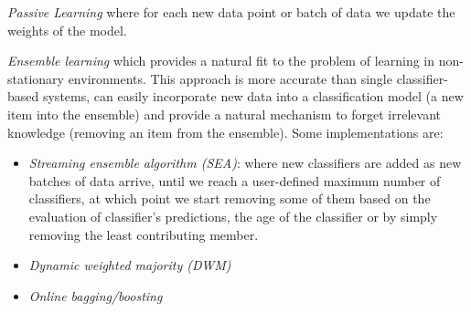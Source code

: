 \documentclass{article}
\begin{document}
      \emph{Passive Learning} where for each new data point or batch of data we update the weights of the model.
      
      \emph{Ensemble learning} which provides a natural fit to the problem of learning in non-stationary environments. This approach is more accurate than single classifier-based systems, can easily incorporate new data into a classification model (a new item into the
      ensemble) and provide a natural mechanism to forget irrelevant knowledge (removing an item from the ensemble). Some implementations are:
      \begin{itemize}
        \item \emph{Streaming ensemble algorithm (SEA)}: where new classifiers are added as new batches of data arrive, until we reach a user-defined maximum number of classifiers, at which point we start removing some of them based on the evaluation of classifier’s predictions,
        the age of the classifier or by simply removing the least contributing member.

        \item \emph{Dynamic weighted majority (DWM)}
        \item \emph{Online bagging/boosting}

      \end{itemize}
\end{document}
